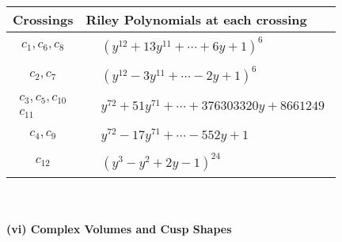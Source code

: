 \documentclass[1p]{elsarticle_modified}
\theoremstyle{definition}
\begin{document}
\begin{tabular}{m{50pt}|m{274pt}}
Crossings & \hspace{64pt}Riley Polynomials at each crossing \\
\hline $$\begin{aligned}c_{1},c_{6},c_{8}\end{aligned}$$&$\begin{aligned}
&(y^{12}+13 y^{11}+\cdots+6 y+1)^{6}
\end{aligned}$\\
\hline $$\begin{aligned}c_{2},c_{7}\end{aligned}$$&$\begin{aligned}
&(y^{12}-3 y^{11}+\cdots-2 y+1)^{6}
\end{aligned}$\\
\hline $$\begin{aligned}c_{3},c_{5},c_{10}\\c_{11}\end{aligned}$$&$\begin{aligned}
&y^{72}+51 y^{71}+\cdots+376303320 y+8661249
\end{aligned}$\\
\hline $$\begin{aligned}c_{4},c_{9}\end{aligned}$$&$\begin{aligned}
&y^{72}-17 y^{71}+\cdots-552 y+1
\end{aligned}$\\
\hline $$\begin{aligned}c_{12}\end{aligned}$$&$\begin{aligned}
&(y^3- y^2+2 y-1)^{24}
\end{aligned}$\\
\hline
\end{tabular}\\~\\
\newpage\flushleft \textbf{(vi) Complex Volumes and Cusp Shapes}
\end{document}
